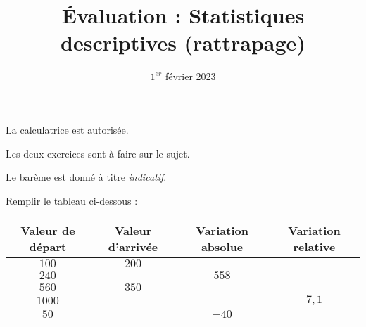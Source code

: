 \documentclass[
	classe=$2^{de}$
]{évaluation}
\title{Évaluation : Statistiques descriptives (rattrapage)}
\date{$1^{er}$ février 2023}
\begin{document}
\maketitle

\begin{tcolorbox}
	La calculatrice est autorisée.

	Les deux exercices sont à faire sur le sujet.

	Le barème est donné à titre \textit{indicatif}.
\end{tcolorbox}

\begin{exercice}[4]
	Remplir le tableau ci-dessous :

	\begin{center}
		\begin{tabular}{|c|c|c|c|}
			\hline
			Valeur de départ & Valeur d'arrivée    & Variation absolue   & Variation relative    \\ \hline
			$100$            & $200$               & \correction{$100$}  & \correction{$1$}      \\ \hline
			$240$            & \correction{$798$}  & $558$               & \correction{$2,325$}  \\ \hline
			$560$            & $350$               & \correction{$-210$} & \correction{$-0,375$} \\ \hline
			$1000$           & \correction{$8100$} & \correction{$7100$} & $7,1$                 \\ \hline
			$50$             & \correction{$10$}   & $-40$               & \correction{$-0,8$}   \\ \hline
		\end{tabular}
	\end{center}
\end{exercice}
\end{document}
